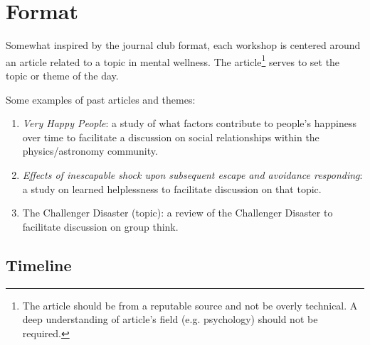 \documentclass[addpoints,12pt]{exam}
\numberwithin{equation}{section}
\begin{document}
	\section{Format}
	
	Somewhat inspired by the journal club format, each workshop is centered around an article related to a topic in mental wellness. The article\footnote{The article should be from a reputable source and not be overly technical. A deep understanding of article's field (e.g. psychology) should not be required.} serves to set the topic or theme of the day.
	
	Some examples of past articles and themes:
	\begin{enumerate}
		\item \textit{Very Happy People}\cite{diener2002very}: a study of what factors contribute to people's happiness over time to facilitate a discussion on social relationships within the physics/astronomy community.
		\item \textit{Effects of inescapable shock upon subsequent escape and avoidance responding}\cite{overmier1967effects}: a study on learned helplessness to facilitate discussion on that topic.
		\item The Challenger Disaster (topic): a review of the Challenger Disaster to facilitate discussion on group think. 
	\end{enumerate}

	\subsection{Timeline}
	
\end{document}
